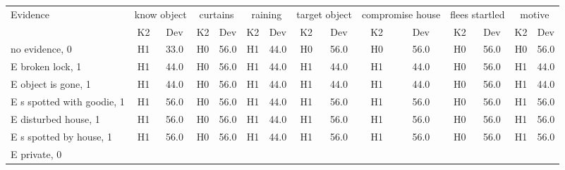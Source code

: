 \begin{table}\begin{tabular}{l|cc|cc|cc|cc|cc|cc|cc}\toprule\multirow{2}{*}{Evidence} & \multicolumn{2}{c}{know object}& \multicolumn{2}{c}{curtains}& \multicolumn{2}{c}{raining}& \multicolumn{2}{c}{target object}& \multicolumn{2}{c}{compromise house}& \multicolumn{2}{c}{flees startled}& \multicolumn{2}{c}{motive}\\& {K2} & {Dev}& {K2} & {Dev}& {K2} & {Dev}& {K2} & {Dev}& {K2} & {Dev}& {K2} & {Dev}& {K2} & {Dev}\\\midrule
no evidence, 0 & \cellcolor{Bittersweet}H1&\cellcolor{Bittersweet}33.0&\cellcolor{Bittersweet}H0&\cellcolor{Bittersweet}56.0&\cellcolor{Bittersweet}H1&\cellcolor{Bittersweet}44.0&\cellcolor{Bittersweet}H0&\cellcolor{Bittersweet}56.0&\cellcolor{Bittersweet}H0&\cellcolor{Bittersweet}56.0&\cellcolor{Bittersweet}H0&\cellcolor{Bittersweet}56.0&\cellcolor{Bittersweet}H0&\cellcolor{Bittersweet}56.0\\E broken lock, 1 & \cellcolor{Bittersweet}H1&\cellcolor{Bittersweet}44.0&\cellcolor{Bittersweet}H0&\cellcolor{Bittersweet}56.0&\cellcolor{Bittersweet}H1&\cellcolor{Bittersweet}44.0&\cellcolor{Bittersweet}H1&\cellcolor{Bittersweet}44.0&\cellcolor{Bittersweet}H1&\cellcolor{Bittersweet}44.0&\cellcolor{Bittersweet}H0&\cellcolor{Bittersweet}56.0&\cellcolor{Bittersweet}H1&\cellcolor{Bittersweet}44.0\\E object is gone, 1 & \cellcolor{Bittersweet}H1&\cellcolor{Bittersweet}44.0&\cellcolor{Bittersweet}H0&\cellcolor{Bittersweet}56.0&\cellcolor{Bittersweet}H1&\cellcolor{Bittersweet}44.0&\cellcolor{Bittersweet}H1&\cellcolor{Bittersweet}44.0&\cellcolor{Bittersweet}H1&\cellcolor{Bittersweet}44.0&\cellcolor{Bittersweet}H0&\cellcolor{Bittersweet}56.0&\cellcolor{Bittersweet}H1&\cellcolor{Bittersweet}44.0\\E s spotted with goodie, 1 & \cellcolor{Bittersweet}H1&\cellcolor{Bittersweet}56.0&\cellcolor{Bittersweet}H0&\cellcolor{Bittersweet}56.0&\cellcolor{Bittersweet}H1&\cellcolor{Bittersweet}44.0&\cellcolor{Bittersweet}H1&\cellcolor{Bittersweet}56.0&\cellcolor{Bittersweet}H1&\cellcolor{Bittersweet}56.0&\cellcolor{Bittersweet}H0&\cellcolor{Bittersweet}56.0&\cellcolor{Bittersweet}H1&\cellcolor{Bittersweet}56.0\\E disturbed house, 1 & \cellcolor{Bittersweet}H1&\cellcolor{Bittersweet}56.0&\cellcolor{Bittersweet}H0&\cellcolor{Bittersweet}56.0&\cellcolor{Bittersweet}H1&\cellcolor{Bittersweet}44.0&\cellcolor{Bittersweet}H1&\cellcolor{Bittersweet}56.0&\cellcolor{Bittersweet}H1&\cellcolor{Bittersweet}56.0&\cellcolor{Bittersweet}H0&\cellcolor{Bittersweet}56.0&\cellcolor{Bittersweet}H1&\cellcolor{Bittersweet}56.0\\E s spotted by house, 1 & \cellcolor{Bittersweet}H1&\cellcolor{Bittersweet}56.0&\cellcolor{Bittersweet}H0&\cellcolor{Bittersweet}56.0&\cellcolor{Bittersweet}H1&\cellcolor{Bittersweet}44.0&\cellcolor{Bittersweet}H1&\cellcolor{Bittersweet}56.0&\cellcolor{Bittersweet}H1&\cellcolor{Bittersweet}56.0&\cellcolor{Bittersweet}H0&\cellcolor{Bittersweet}56.0&\cellcolor{Bittersweet}H1&\cellcolor{Bittersweet}56.0\\E private, 0 & 
\end{tabular}
\end{table}

